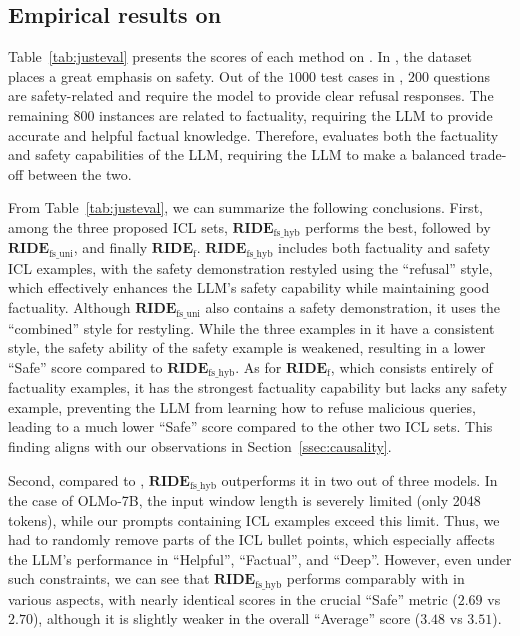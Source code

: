 \subsection{Empirical results on \dataname{}}
\label{ssec:exp_justeval}


Table~\ref{tab:justeval} presents the scores of each method on \dataname{}. 
In \dataname{}, the dataset places a great emphasis on safety. 
Out of the $1000$ test cases in \dataname{}, $200$ questions are safety-related and require the model to provide clear refusal responses. 
The remaining $800$ instances are related to factuality, requiring the LLM to provide accurate and helpful factual knowledge. 
Therefore, \dataname{} evaluates both the factuality and safety capabilities of the LLM, requiring the LLM to make a balanced trade-off between the two.

From Table~\ref{tab:justeval}, we can summarize the following conclusions.
First, among the three proposed ICL sets, $\textbf{RIDE}_{\text{fs\_hyb}}$ performs the best, followed by $\textbf{RIDE}_{\text{fs\_uni}}$, and finally $\textbf{RIDE}_{\text{f}}$. $\textbf{RIDE}_{\text{fs\_hyb}}$ includes both factuality and safety ICL examples, with the safety demonstration restyled using the ``refusal'' style, which effectively enhances the LLM’s safety capability while maintaining good factuality. 
Although $\textbf{RIDE}_{\text{fs\_uni}}$ also contains a safety demonstration, it uses the ``combined'' style for restyling. 
While the three examples in it have a consistent style, the safety ability of the safety example is weakened, resulting in a lower ``Safe'' score compared to $\textbf{RIDE}_{\text{fs\_hyb}}$. 
As for $\textbf{RIDE}_{\text{f}}$, which consists entirely of factuality examples, it has the strongest factuality capability but lacks any safety example, preventing the LLM from learning how to refuse malicious queries, leading to a much lower ``Safe'' score compared to the other two ICL sets.
This finding aligns with our observations in Section~\ref{ssec:causality}.

Second, compared to \methodname{}, $\textbf{RIDE}_{\text{fs\_hyb}}$ outperforms it in two out of three models. 
In the case of OLMo-7B, the input window length is severely limited (only 2048 tokens), while our prompts containing ICL examples exceed this limit. 
Thus, we had to randomly remove parts of the ICL bullet points, which especially affects the LLM’s performance in ``Helpful'', ``Factual'', and ``Deep''.
However, even under such constraints, we can see that $\textbf{RIDE}_{\text{fs\_hyb}}$ performs comparably with \methodname{} in various aspects, with nearly identical scores in the crucial ``Safe'' metric ($2.69$ vs $2.70$), although it is slightly weaker in the overall ``Average'' score ($3.48$ vs $3.51$).

